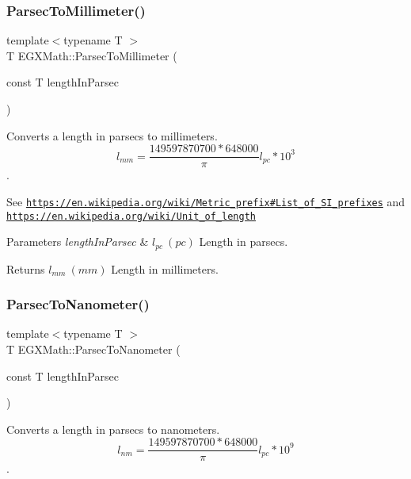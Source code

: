 \subsubsection{\texorpdfstring{Parsec\+To\+Millimeter()}{ParsecToMillimeter()}}
{\footnotesize\ttfamily template$<$typename T $>$ \\
T E\+G\+X\+Math\+::\+Parsec\+To\+Millimeter (\begin{DoxyParamCaption}\item[{const T}]{length\+In\+Parsec }\end{DoxyParamCaption})}



Converts a length in parsecs to millimeters. \[ l_{mm}=\frac{149597870700 * 648000}{\pi}l_{pc} * 10^{3} \]. 

See \href{https://en.wikipedia.org/wiki/Metric_prefix#List_of_SI_prefixes}{\tt https\+://en.\+wikipedia.\+org/wiki/\+Metric\+\_\+prefix\#\+List\+\_\+of\+\_\+\+S\+I\+\_\+prefixes} and \href{https://en.wikipedia.org/wiki/Unit_of_length}{\tt https\+://en.\+wikipedia.\+org/wiki/\+Unit\+\_\+of\+\_\+length} 
\begin{DoxyParams}{Parameters}
{\em length\+In\+Parsec} & $ l_{pc}\ (pc)$ Length in parsecs. \\
\hline
\end{DoxyParams}
\begin{DoxyReturn}{Returns}
$ l_{mm}\ (mm)$ Length in millimeters. 
\end{DoxyReturn}
\mbox{\label{group___e_g_x_math-_conversions-_length_conversions-_astronomical-_parsec-_s_i_gab2226196e39edbba8fe0862d0fd75870}} 
\subsubsection{\texorpdfstring{Parsec\+To\+Nanometer()}{ParsecToNanometer()}}
{\footnotesize\ttfamily template$<$typename T $>$ \\
T E\+G\+X\+Math\+::\+Parsec\+To\+Nanometer (\begin{DoxyParamCaption}\item[{const T}]{length\+In\+Parsec }\end{DoxyParamCaption})}



Converts a length in parsecs to nanometers. \[ l_{nm}=\frac{149597870700 * 648000}{\pi}l_{pc} * 10^{9} \]. 

